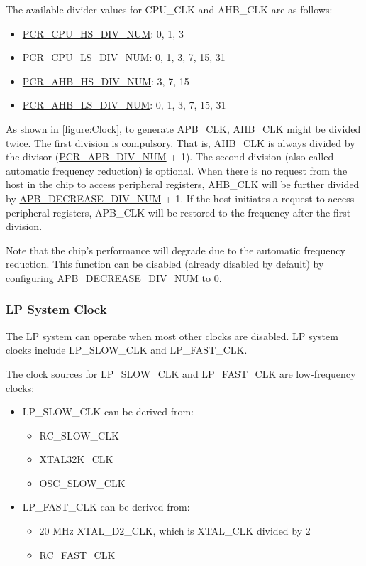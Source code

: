 \documentclass[main\_\_EN.tex]{subfiles}
\begin{document}
The available divider values for CPU\_CLK and AHB\_CLK are as follows:

\begin{itemize}
     \item \hyperref[fielddesc:PCRCPUHSDIVNUM]{PCR\_CPU\_HS\_DIV\_NUM}: 0, 1, 3
     \item \hyperref[fielddesc:PCRCPULSDIVNUM]{PCR\_CPU\_LS\_DIV\_NUM}: 0, 1, 3, 7, 15, 31
     \item \hyperref[fielddesc:PCRAHBHSDIVNUM]{PCR\_AHB\_HS\_DIV\_NUM}: 3, 7, 15
     \item \hyperref[fielddesc:PCRAHBLSDIVNUM]{PCR\_AHB\_LS\_DIV\_NUM}: 0, 1, 3, 7, 15, 31
\end{itemize}

As shown in \ref{figure:Clock}, to generate APB\_CLK, AHB\_CLK might be divided twice. The first division is compulsory. That is, AHB\_CLK is always divided by the divisor (\hyperref[fielddesc:PCRAPBDIVNUM]{PCR\_APB\_DIV\_NUM} + 1). The second division (also called automatic frequency reduction) is optional. When there is no request from the host in the chip to access peripheral registers, AHB\_CLK will be further divided by \hyperref[fielddesc:PCRAPBDECREASEDIVNUM]{APB\_DECREASE\_DIV\_NUM} + 1. If the host initiates a request to access peripheral registers, APB\_CLK will be restored to the frequency after the first division.

Note that the chip's performance will degrade due to the automatic frequency reduction. This function can be disabled (already disabled by default) by configuring \hyperref[fielddesc:PCRAPBDECREASEDIVNUM]{APB\_DECREASE\_DIV\_NUM} to 0.

\subsubsection{LP System Clock}

The LP system can operate when most other clocks are disabled. LP system clocks include LP\_SLOW\_CLK and LP\_FAST\_CLK.

The clock sources for LP\_SLOW\_CLK and LP\_FAST\_CLK are low-frequency clocks:
\begin{itemize}
    \item LP\_SLOW\_CLK can be derived from:
    \begin{itemize}
        \item RC\_SLOW\_CLK
        \item XTAL32K\_CLK
        \item OSC\_SLOW\_CLK
    \end{itemize}
    \item LP\_FAST\_CLK can be derived from:
    \begin{itemize}
        \item 20 MHz XTAL\_D2\_CLK, which is XTAL\_CLK divided by 2
        \item RC\_FAST\_CLK
    \end{itemize}
\end{itemize}
\end{document}
